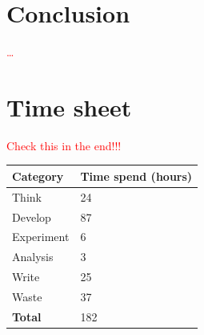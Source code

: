 \documentclass{stylesheet}
\begin{document}
\section{Conclusion}
\label{sec:conclusion}
\textcolor{red}{\ldots}

%
%

\appendix
\section{Time sheet}
\label{app:time}
\textcolor{red}{Check this in the end!!!}
\begin{table}[h]
\begin{tabular}{ll}
\hline
\textbf{Category} & \textbf{Time spend (hours)} \\
\hline
Think & 24 \\
Develop & 87 \\
Experiment & 6 \\
Analysis & 3 \\
Write & 25 \\
Waste & 37 \\
\textbf{Total} & 182 \\
\hline
\end{tabular}
\end{table}
\end{document}
